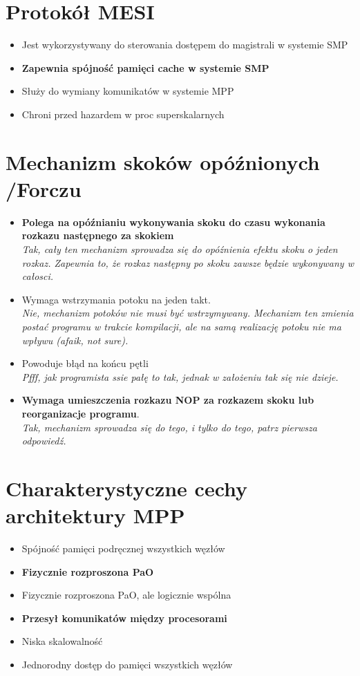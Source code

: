 \documentclass[a4paper,twoside]{article}
\begin{document}
\section{Protokół MESI}
	\begin{itemize}
    \item Jest wykorzystywany do sterowania dostępem do magistrali w systemie SMP
    \item \textbf{Zapewnia spójność pamięci cache w systemie SMP}
    \item Służy do wymiany komunikatów w systemie MPP
    \item Chroni przed hazardem w proc superskalarnych
    \end{itemize}
    
\section{Mechanizm skoków opóźnionych {\small /Forczu}}
	\begin{itemize}
    \item \textbf{Polega na opóźnianiu wykonywania skoku do czasu wykonania rozkazu następnego za skokiem}\\
    {\small \emph{Tak, cały ten mechanizm sprowadza się do opóźnienia efektu skoku o jeden rozkaz. Zapewnia to, że rozkaz następny po skoku zawsze będzie wykonywany w całosci.}}
    \item Wymaga wstrzymania potoku na jeden takt.\\
    {\small \emph{Nie, mechanizm potoków nie musi być wstrzymywany. Mechanizm ten zmienia postać programu w trakcie kompilacji, ale na samą realizację potoku nie ma wpływu (afaik, not sure).}}
    \item Powoduje błąd na końcu pętli\\
    {\small \emph{Pfff, jak programista ssie pałę to tak, jednak w założeniu tak się nie dzieje.}}
    \item \textbf{Wymaga umieszczenia rozkazu NOP za rozkazem skoku lub reorganizacje programu}.\\
    {\small \emph{Tak, mechanizm sprowadza się do tego, i tylko do tego, patrz pierwsza odpowiedź.}}
    \end{itemize}
    
\section{Charakterystyczne cechy architektury MPP}
	\begin{itemize}
    \item Spójność pamięci podręcznej wszystkich węzłów
    \item \textbf{Fizycznie rozproszona PaO}
    \item Fizycznie rozproszona PaO, ale logicznie wspólna
    \item \textbf{Przesył komunikatów między procesorami}
    \item Niska skalowalność
    \item Jednorodny dostęp do pamięci wszystkich węzłów
    \end{itemize}
\end{document}
